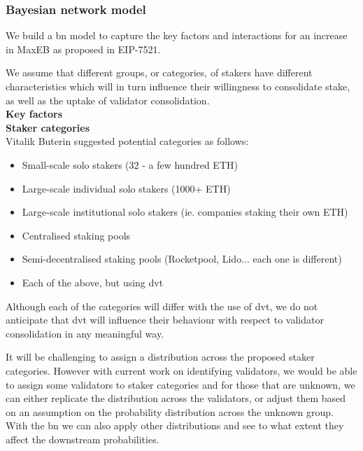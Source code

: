 \subsubsection{Bayesian network model}
We build a \gls{bn} model to capture the key factors and interactions for an increase in MaxEB as proposed in EIP-7521.

We assume that different groups, or categories, of stakers have different characteristics which will in turn influence their willingness to consolidate stake, as well as the uptake of validator consolidation. \\

\noindent
\textbf{Key factors} \\

\noindent
\textbf{Staker categories} \\
Vitalik Buterin suggested potential categories as follows:
\begin{itemize}
\item Small-scale solo stakers (32 - a few hundred ETH)
\item Large-scale individual solo stakers (1000+ ETH)
\item Large-scale institutional solo stakers (ie. companies staking their own ETH)
\item Centralised staking pools
\item Semi-decentralised staking pools (Rocketpool, Lido... each one is different)
\item Each of the above, but using \gls{dvt}
\end{itemize}

Although each of the categories will differ with the use of \gls{dvt}, we do not anticipate that \gls{dvt} will influence their behaviour with respect to validator consolidation in any meaningful way. 

It will be challenging to assign a distribution across the proposed staker categories. However with current work on identifying validators, we would be able to assign some validators to staker categories and for those that are unknown, we can either replicate the distribution across the validators, or adjust them based on an assumption on the probability distribution across the unknown group. With the \gls{bn} we can also apply other distributions and see to what extent they affect the downstream probabilities. \\


